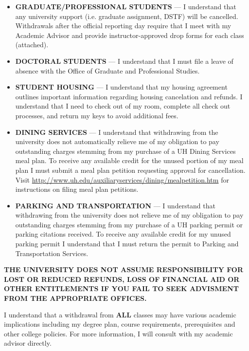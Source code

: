 \documentclass[11pt]{article}
\begin{document}
\begin{itemize}
\item[] \textbf{GRADUATE/PROFESSIONAL STUDENTS} — I understand that any university support (i.e. graduate assignment, DSTF) will be cancelled. Withdrawals after the official reporting day require that I meet with my Academic Advisor and provide instructor-approved drop forms for each class (attached).

\item[] \textbf{DOCTORAL STUDENTS} — I understand that I must file a leave of absence with the Office of Graduate and Professional Studies.

\item[] \textbf{STUDENT HOUSING} — I understand that my housing agreement outlines important information regarding housing cancelation and refunds. I understand that I need to check out of my room, complete all check out processes, and return my keys to avoid additional fees.

\item[] \textbf{DINING SERVICES} — I understand that withdrawing from the university does not automatically relieve me of my obligation to pay outstanding charges stemming from my purchase of a UH Dining Services meal plan. To receive any available credit for the unused portion of my meal plan I must submit a meal plan petition requesting approval for cancellation. Visit \url{http://www.uh.edu/auxiliaryservices/dining/mealpetition.htm} for instructions on filing meal plan petitions.

\item[] \textbf{PARKING AND TRANSPORTATION} — I understand that withdrawing from the university does not relieve me of my obligation to pay outstanding charges stemming from my purchase of a UH parking permit or parking citations received. To receive any available credit for my unused parking permit I understand that I must return the permit to Parking and Transportation Services.
\end{itemize}

\begin{center}
\small\textbf{THE UNIVERSITY DOES NOT ASSUME RESPONSIBILITY FOR LOST OR REDUCED REFUNDS, LOSS OF FINANCIAL AID OR OTHER ENTITLEMENTS IF YOU FAIL TO SEEK ADVISMENT FROM THE APPROPRIATE OFFICES.}
\end{center}

I understand that a withdrawal from \textbf{ALL} classes may have various academic implications including my degree plan, course requirements, prerequisites and other college policies. For more information, I will consult with my academic advisor directly.
\end{document}
